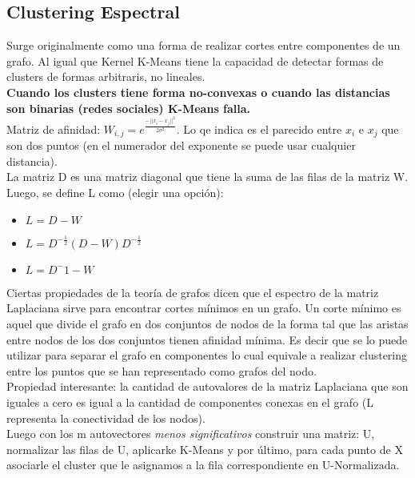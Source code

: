 \documentclass[titlepage,a4paper]{article}
\begin{document}
\subsection*{Clustering Espectral}
Surge originalmente como una forma de realizar cortes entre componentes de un grafo. Al igual que Kernel K-Means tiene la capacidad de detectar formas de clusters de formas arbitraris, no lineales. \\

\textbf{Cuando los clusters tiene forma no-convexas o cuando las distancias son binarias (redes sociales) K-Means falla.}\\

Matriz de afinidad: $W_{i,j} = e ^{\frac{-||x_i - x_j|| ^2}{2 \sigma^2}}$. Lo qe indica es el parecido entre $x_i$ e $x_j$ que son dos puntos (en el numerador del exponente se puede usar cualquier distancia). \\

La matriz D es una matriz diagonal que tiene la suma de las filas de la matriz W. \\

Luego, se define L como (elegir una opción):
\begin{itemize}
\item $L = D - W$
\item $L = D^{-\frac{1}{2}} (D-W)D^{-\frac{1}{2}} $
\item $L = D^-1 - W$
\end{itemize}
 
Ciertas propiedades de la teoría de grafos dicen que el espectro de la matriz Laplaciana sirve para encontrar cortes mínimos en un grafo. Un corte mínimo es aquel que divide el grafo en dos conjuntos de nodos de la forma tal que las aristas entre nodos de los dos conjuntos tienen afinidad mínima. Es decir que se lo puede utilizar para separar el grafo en componentes lo cual equivale a realizar clustering entre los puntos que se han representado como grafos del nodo. \\

Propiedad interesante: la cantidad de autovalores de la matriz Laplaciana que son iguales a cero  es igual a la cantidad de componentes conexas en el grafo (L representa la conectividad de los nodos). \\

Luego con los m autovectores \textit{menos significativos }construir una matriz: U, normalizar las filas de U, aplicarke K-Means y por último, para cada punto de X asociarle el cluster  que le asignamos a la fila correspondiente en U-Normalizada. 
\end{document}
